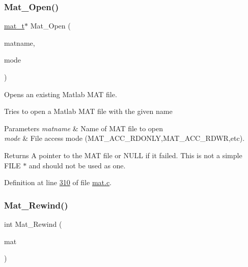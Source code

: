 \subsubsection{\texorpdfstring{Mat\+\_\+\+Open()}{Mat\_Open()}}
{\footnotesize\ttfamily \hyperlink{group___m_a_t_gab0fc888f5a5d79943b16284b1f91c2e8}{mat\+\_\+t}$\ast$ Mat\+\_\+\+Open (\begin{DoxyParamCaption}\item[{const char $\ast$}]{matname,  }\item[{int}]{mode }\end{DoxyParamCaption})}



Opens an existing Matlab M\+AT file. 

Tries to open a Matlab M\+AT file with the given name


\begin{DoxyParams}{Parameters}
{\em matname} & Name of M\+AT file to open \\
\hline
{\em mode} & File access mode (M\+A\+T\+\_\+\+A\+C\+C\+\_\+\+R\+D\+O\+N\+LY,M\+A\+T\+\_\+\+A\+C\+C\+\_\+\+R\+D\+WR,etc). \\
\hline
\end{DoxyParams}
\begin{DoxyReturn}{Returns}
A pointer to the M\+AT file or N\+U\+LL if it failed. This is not a simple F\+I\+LE $\ast$ and should not be used as one. 
\end{DoxyReturn}


Definition at line \hyperlink{mat_8c_source_l00310}{310} of file \hyperlink{mat_8c_source}{mat.\+c}.

\mbox{\label{group___m_a_t_ga4d6e3892d2e216c507a744ba0e070d0b}} 
\subsubsection{\texorpdfstring{Mat\+\_\+\+Rewind()}{Mat\_Rewind()}}
{\footnotesize\ttfamily int Mat\+\_\+\+Rewind (\begin{DoxyParamCaption}\item[{\hyperlink{group___m_a_t_gab0fc888f5a5d79943b16284b1f91c2e8}{mat\+\_\+t} $\ast$}]{mat }\end{DoxyParamCaption})}



